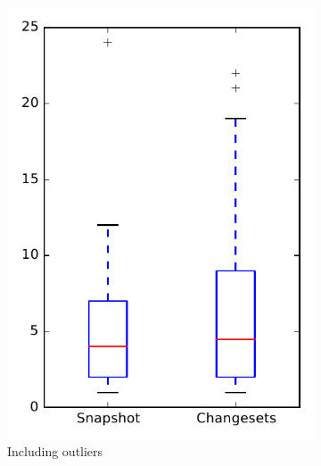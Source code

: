 
\begin{figure}
    \centering
    \begin{subfigure}{.4\textwidth}
        \centering
        \includegraphics[height=0.4\textheight]{figures/dit/rq1_tika}
        \caption{Including outliers}\label{fig:dit:rq1:tika_outlier}
    \end{subfigure}%
    \begin{subfigure}{.4\textwidth}
        \centering

\end{subfigure}
\end{figure}
